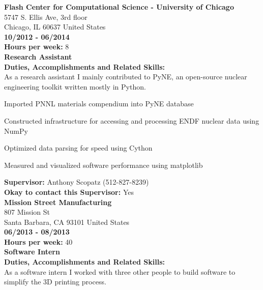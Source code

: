 \noindent\textbf{Flash Center for Computational Science - University of Chicago}\\
5747 S. Ellis Ave, 3rd floor\\
Chicago, IL   60637 United States\\
\textbf{10/2012 - 06/2014}\\
\textbf{Hours per week:} 8\\
\textbf{Research Assistant}\\
\textbf{Duties, Accomplishments and Related Skills:}\\
As a research assistant I mainly contributed to PyNE, an open-source nuclear
engineering toolkit written mostly in Python.
\begin{tightlist}

\item Imported PNNL materials compendium into PyNE database

\item Constructed infrastructure for accessing and processing ENDF nuclear data using NumPy

\item Optimized data parsing for speed using Cython

\item Measured and visualized software performance using matplotlib

\end{tightlist}
\textbf{Supervisor:} Anthony Scopatz (512-827-8239)\\
\textbf{Okay to contact this Supervisor:} Yes\\

\noindent\textbf{Mission Street Manufacturing}\\
807 Mission St\\
Santa Barbara, CA   93101 United States\\
\textbf{06/2013 - 08/2013}\\
\textbf{Hours per week:} 40\\
\textbf{Software Intern}\\
\textbf{Duties, Accomplishments and Related Skills:}\\
As a software intern I worked with three other people to build software to simplify the 3D printing process.

